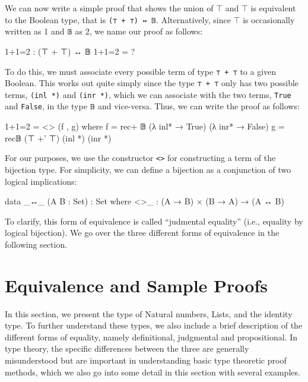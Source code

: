 \documentclass[12pt]{article}
\begin{document}
We can now write a simple proof that shows the union of \(\top\) and \(\top\)
is equivalent to the Boolean type, that is {\tt (⊤ + ⊤) ↔ 𝔹}.
Alternatively, since \(\top\) is occasionally written as 1 and {\tt 𝔹} as 2, we
name our proof as follows:
\begin{center}
\begin{minipage}{0.9\textwidth}
\begin{code}
1+1=2 : (⊤ + ⊤) ↔ 𝔹
1+1=2 = ?
\end{code}
\end{minipage}
\end{center}
To do this, we must associate every possible term of type {\tt ⊤ + ⊤} to a
given Boolean. This works out quite simply since the type {\tt ⊤ + ⊤} only has
two possible terms, {\tt (inl *)} and {\tt (inr *)}, which we can associate with
the two terms, {\tt True} and {\tt False}, in the type {\tt 𝔹} and vice-versa.
Thus, we can write the proof as follows:
\begin{center}
\begin{minipage}{0.9\textwidth}
\begin{code}
1+1=2 = <> (f , g)
  where f = rec+ 𝔹 (λ inl* → True) (λ inr* → False)
        g = rec𝔹 (⊤ +' ⊤) (inl *) (inr *)
\end{code}
\end{minipage}
\end{center}
For our purposes, we use the constructor {\tt <>} for constructing a term of
the bijection type. For simplicity, we can define a bijection as a conjunction
of two logical implications:
\begin{center}
\begin{minipage}{0.9\textwidth}
\begin{code}
data _↔_ (A B : Set) : Set where
  <>_ : (A → B) × (B → A) → (A ↔ B)
\end{code}
\end{minipage}
\end{center}
To clarify, this form of equivalence is called ``judmental equality'' (i.e.,
equality by logical bijection). We go over the three different forms of
equivalence in the following section.

\section{Equivalence and Sample Proofs}
In this section, we present the type of Natural numbers, Lists, and the identity
type. To further understand these types, we also include a brief description of
the different forms of equality, namely definitional, judgmental and
propositional. In type theory, the specific differences between the three are
generally misunderstood but are important in understanding basic type theoretic
proof methods, which we also go into some detail in this section with several
examples.
\end{document}
